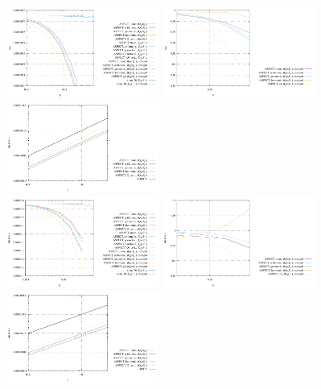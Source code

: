 \begin{center}
\includegraphics[width=5cm]{images/sinking_block/vrms_FS}
\includegraphics[width=5cm]{images/sinking_block/vrms_FS_extrapolation_rate}
\includegraphics[width=5cm]{images/sinking_block/vrms_FS_error}\\
\includegraphics[width=5cm]{images/sinking_block/maxvel_FS}
\includegraphics[width=5cm]{images/sinking_block/maxvel_FS_extrapolation_rate}
\includegraphics[width=5cm]{images/sinking_block/maxvel_FS_error}
\end{center}

